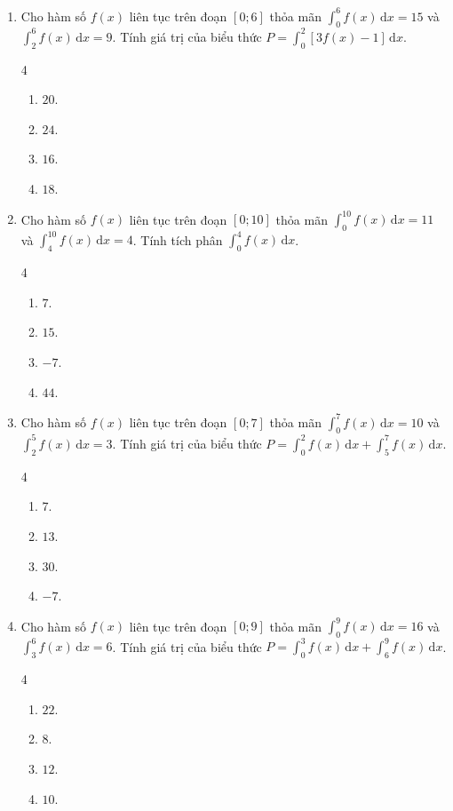 \documentclass[12pt]{article}
\begin{document}
\begin{enumerate}[label=\textbf{Câu \arabic*.}]
		\item Cho hàm số $f(x)$ liên tục trên đoạn $[0; 6]$ thỏa mãn $\displaystyle \int_0^6 f(x)\,\mathrm{d}x = 15$ và $\displaystyle \int_2^6 f(x)\,\mathrm{d}x = 9$. Tính giá trị của biểu thức $P = \displaystyle \int_0^2 [3f(x) - 1]\,\mathrm{d}x$.
		\begin{multicols}{4}
			\begin{enumerate}[label=\textbf{\Alph*.}]
				\item $20$.
				\item $24$.
				\item $16$.
				\item $18$.
			\end{enumerate}
		\end{multicols}
		
		\item Cho hàm số $f(x)$ liên tục trên đoạn $[0; 10]$ thỏa mãn $\displaystyle \int_0^{10} f(x)\,\mathrm{d}x = 11$ và $\displaystyle \int_4^{10} f(x)\,\mathrm{d}x = 4$. Tính tích phân $\displaystyle \int_0^4 f(x)\,\mathrm{d}x$.
		\begin{multicols}{4}
			\begin{enumerate}[label=\textbf{\Alph*.}]
				\item $7$.
				\item $15$.
				\item $-7$.
				\item $44$.
			\end{enumerate}
		\end{multicols}
		
		\item Cho hàm số $f(x)$ liên tục trên đoạn $[0; 7]$ thỏa mãn $\displaystyle \int_0^7 f(x)\,\mathrm{d}x = 10$ và $\displaystyle \int_2^5 f(x)\,\mathrm{d}x = 3$. Tính giá trị của biểu thức $P = \displaystyle \int_0^2 f(x)\,\mathrm{d}x + \int_5^7 f(x)\,\mathrm{d}x$.
		\begin{multicols}{4}
			\begin{enumerate}[label=\textbf{\Alph*.}]
				\item $7$.
				\item $13$.
				\item $30$.
				\item $-7$.
			\end{enumerate}
		\end{multicols}
		
		\item Cho hàm số $f(x)$ liên tục trên đoạn $[0; 9]$ thỏa mãn $\displaystyle \int_0^9 f(x)\,\mathrm{d}x = 16$ và $\displaystyle \int_3^6 f(x)\,\mathrm{d}x = 6$. Tính giá trị của biểu thức $P = \displaystyle \int_0^3 f(x)\,\mathrm{d}x + \int_6^9 f(x)\,\mathrm{d}x$.
		\begin{multicols}{4}
			\begin{enumerate}[label=\textbf{\Alph*.}]
				\item $22$.
				\item $8$.
				\item $12$.
				\item $10$.
			\end{enumerate}
		\end{multicols}
		

\end{enumerate}
\end{document}
